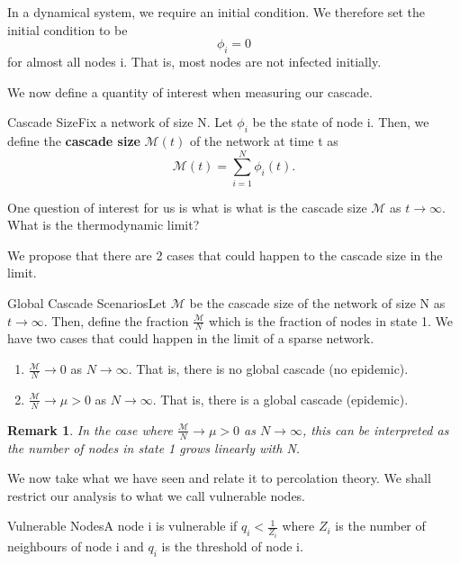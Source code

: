 \documentclass[twoside]{article}
\newtheorem{remark}[theorem]{Remark}
\begin{document}
In a dynamical system, we require an initial condition. We therefore set the initial condition to be 
$$
\phi_i = 0
$$
for almost all nodes i. That is, most nodes are not infected initially.

We now define a quantity of interest when measuring our cascade.
\begin{definition_exam}{Cascade Size}{}Fix a network of size N. Let $\phi_i$ be the state of node i. Then, we define the \textbf{cascade size} $\mathcal{M}(t)$ of the network at time t as 
$$
\mathcal{M}(t) = \sum_{i=1}^{N}\phi_i(t).
$$
\end{definition_exam}

One question of interest for us is what is what is the cascade size $\mathcal{M}$ as $t \rightarrow \infty.$ What is the thermodynamic limit?

We propose that there are 2 cases that could happen to the cascade size in the limit.

\begin{proposition_exam}{Global Cascade Scenarios}{}Let $\mathcal{M}$ be the cascade size of the network of size N as $t \rightarrow \infty.$ Then, define the fraction $\frac{\mathcal{M}}{N}$ which is the fraction of nodes in state 1. We have two cases that could happen in the limit of a sparse network.
\begin{enumerate}
\item $\frac{\mathcal{M}}{N} \rightarrow 0$ as $N \rightarrow \infty$. That is, there is no global cascade (no epidemic).
\item $\frac{\mathcal{M}}{N} \rightarrow \mu > 0$ as $N \rightarrow \infty$. That is, there is a global cascade (epidemic).
\end{enumerate}
\end{proposition_exam}

\begin{remark}
In the case where $\frac{\mathcal{M}}{N} \rightarrow \mu > 0$ as $N \rightarrow \infty$, this can be interpreted as the number of nodes in state 1 grows linearly with N.
\end{remark}

We now take what we have seen and relate it to percolation theory. We shall restrict our analysis to what we call vulnerable nodes.

\begin{definition_exam}{Vulnerable Nodes}{}A node i is vulnerable if $q_i < \frac{1}{Z_i}$ where $Z_i$ is the number of neighbours of node i and $q_i$ is the threshold of node i.
\end{definition_exam}
\end{document}
